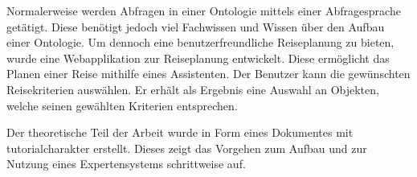 \documentclass[
    paper=a4,               %
    fontsize=10pt,          %
    open=right,             %
    titlepage=false,        %
    parskip=half,           %
]{scrreprt}                 %
\begin{document}
\begin{multicols}{3}
        Normalerweise werden Abfragen in einer Ontologie mittels einer Abfragesprache getätigt. Diese benötigt jedoch viel Fachwissen und Wissen über den Aufbau einer Ontologie. Um dennoch eine benutzerfreundliche Reiseplanung zu bieten, wurde eine Webapplikation zur Reiseplanung entwickelt. Diese ermöglicht das Planen einer Reise mithilfe eines Assistenten. Der Benutzer kann die gewünschten Reisekriterien auswählen. Er erhält als Ergebnis eine Auswahl an Objekten, welche seinen gewählten Kriterien entsprechen.

        Der theoretische Teil der Arbeit wurde in Form eines Dokumentes mit tutorialcharakter erstellt. Dieses zeigt das Vorgehen zum Aufbau und zur Nutzung eines Expertensystems schrittweise auf.

    \end{multicols}

\end{document}
